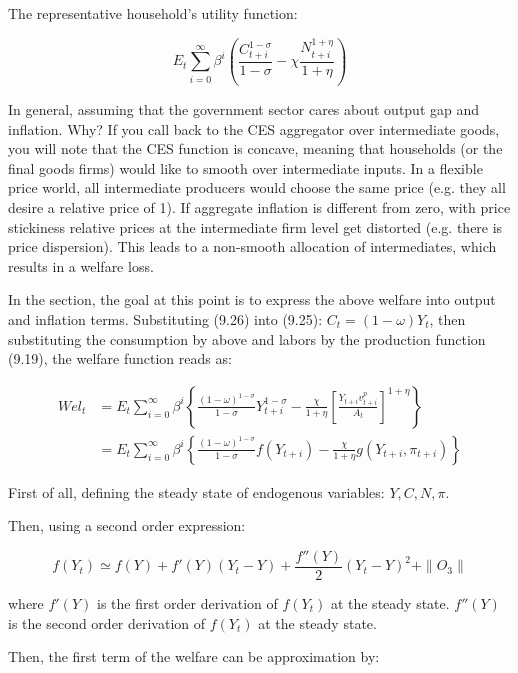 \documentclass[10pt,math=newtx,citestyle=gb7714-2015,bibstyle=gb7714-2015]{elegantbook}
\begin{document}
{	The representative household's utility function:
	
	\begin{equation}
		E_t \sum_{i=0}^{\infty}\beta^i\left(\frac{C_{t+i}^{1-\sigma}}{1-\sigma}-\chi \frac{N_{t+i}^{1+\eta}}{1+\eta}\right)
	\end{equation}
	
	In general, assuming that the government sector cares about output gap and inflation. Why? If you call back to the CES aggregator over intermediate goods, you will note that the CES function is concave, meaning that households (or the final goods firms) would like to smooth over intermediate inputs. In a flexible price world, all intermediate producers would choose the same price (e.g. they all desire a relative price of 1). If aggregate inflation is different from zero, with price stickiness relative prices at the intermediate firm level get distorted (e.g. there is price dispersion). This leads to a non-smooth allocation of intermediates, which results in a welfare loss.
	
	In the section, the goal at this point is to express the above welfare into output and inflation terms. Substituting (9.26) into (9.25): $C_t=(1-\omega)Y_t$, then substituting the consumption by above and labors by the production function (9.19), the welfare function reads as:
	
	\begin{equation*}
		\begin{split}
			Wel_t &=E_t \sum_{i=0}^{\infty}\beta^i\left\{\frac{(1-\omega)^{1-\sigma}}{1-\sigma}Y_{t+i}^{1-\sigma}- \frac{\chi}{1+\eta}\left[\frac{Y_{t+i} v_{t+i}^p }{A_t}\right]^{1+\eta}\right\}\\
			&=E_t \sum_{i=0}^{\infty}\beta^i\left\{\frac{(1-\omega)^{1-\sigma}}{1-\sigma}f(Y_{t+i})-\frac{\chi}{1+\eta}g(Y_{t+i},\pi_{t+i})\right\}
		\end{split}
	\end{equation*}
	
	First of all, defining the steady state of endogenous variables: $Y,C,N,\pi$.
	
	Then, using a second order expression:
	
	$$f(Y_t)\simeq f(Y)+ f'(Y)(Y_t-Y)+\frac{f''(Y)}{2}(Y_t-Y)^2+\parallel O_3\parallel$$
	
	where $f'(Y)$ is the first order derivation of $f(Y_t)$ at the steady state. $f''(Y)$ is the second order derivation of $f(Y_t)$ at the steady state.
	
	Then, the first term of the welfare can be approximation by:
	
}
\end{document}
